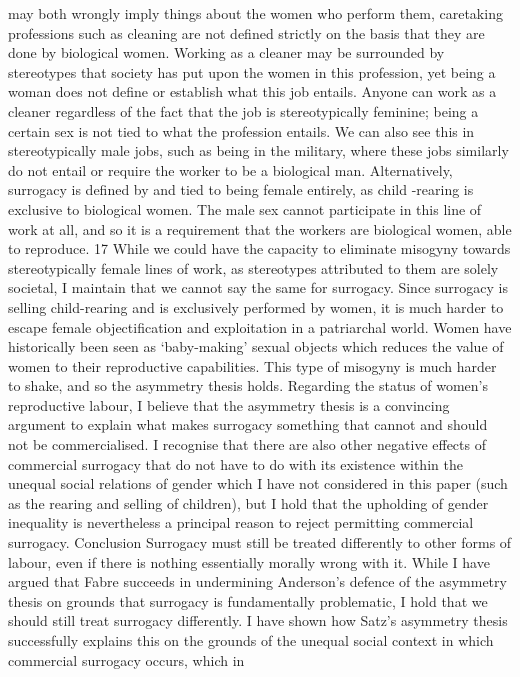 may both wrongly imply things about the women who perform them,
caretaking professions such as cleaning are not defined strictly on the
basis that they are done by biological women. Working as a cleaner may
be surrounded by stereotypes that society has put upon the women in this
profession, yet being a woman does not define or establish what this job
entails. Anyone can work as a cleaner regardless of the fact that the
job is stereotypically feminine; being a certain sex is not tied to what
the profession entails. We can also see this in stereotypically male
jobs, such as being in the military, where these jobs similarly do not
entail or require the worker to be a biological man. Alternatively,
surrogacy is defined by and tied to being female entirely, as child
-rearing is exclusive to biological women. The male sex cannot
participate in this line of work at all, and so it is a requirement that
the workers are biological women, able to reproduce. 17 While we could
have the capacity to eliminate misogyny towards stereotypically female
lines of work, as stereotypes attributed to them are solely societal, I
maintain that we cannot say the same for surrogacy. Since surrogacy is
selling child-rearing and is exclusively performed by women, it is much
harder to escape female objectification and exploitation in a
patriarchal world. Women have historically been seen as `baby-making'
sexual objects which reduces the value of women to their reproductive
capabilities. This type of misogyny is much harder to shake, and so the
asymmetry thesis holds. Regarding the status of women's reproductive
labour, I believe that the asymmetry thesis is a convincing argument to
explain what makes surrogacy something that cannot and should not be
commercialised. I recognise that there are also other negative effects
of commercial surrogacy that do not have to do with its existence within
the unequal social relations of gender which I have not considered in
this paper (such as the rearing and selling of children), but I hold
that the upholding of gender inequality is nevertheless a principal
reason to reject permitting commercial surrogacy. Conclusion Surrogacy
must still be treated differently to other forms of labour, even if
there is nothing essentially morally wrong with it. While I have argued
that Fabre succeeds in undermining Anderson's defence of the asymmetry
thesis on grounds that surrogacy is fundamentally problematic, I hold
that we should still treat surrogacy differently. I have shown how
Satz's asymmetry thesis successfully explains this on the grounds of the
unequal social context in which commercial surrogacy occurs, which in
